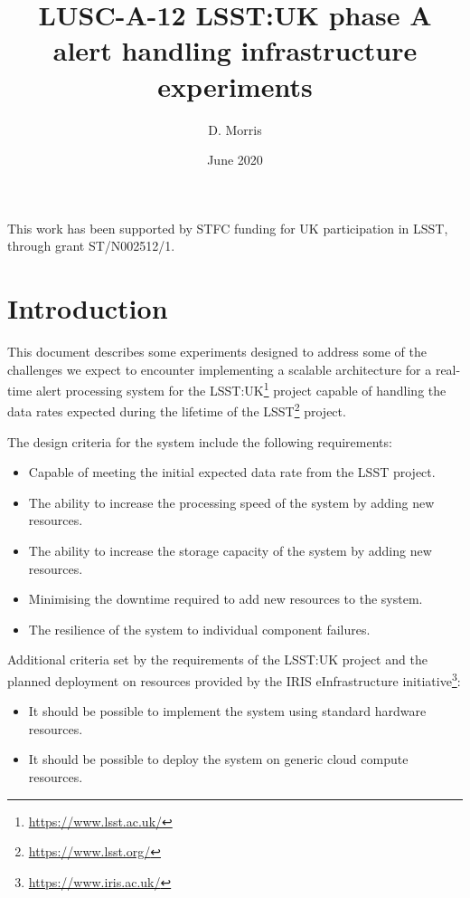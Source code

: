 \documentclass{article}
\title{LUSC-A-12 LSST:UK phase A alert handling infrastructure experiments}
\author{D. Morris}
\date{June 2020}
\newcommand{\lsst} {LSST\xspace}
\newcommand{\lsstuk} {LSST:UK\xspace}
\newcommand{\iris} {IRIS\xspace}
\newcommand{\footurl}[1] {\footnote{\url{#1}}}
\begin{document}
\maketitle

\vspace*{\fill}
This work has been supported by STFC funding for UK participation in LSST, through grant ST/N002512/1.

\clearpage

\tableofcontents
\clearpage

\section{Introduction}
\label{introduction}
This document describes some experiments designed to address some of the challenges we expect to encounter implementing a scalable architecture for a real-time alert processing system for the \lsstuk\footurl{https://www.lsst.ac.uk/} project capable of handling the data rates expected during the lifetime of the \lsst\footurl{https://www.lsst.org/} project.

The design criteria for the system include the following requirements:
\begin{itemize}
  \item Capable of meeting the initial expected data rate from the \lsst project.
  \item The ability to increase the processing speed of the system by adding new resources.
  \item The ability to increase the storage capacity of the system by adding new resources.
  \item Minimising the downtime required to add new resources to the system.
  \item The resilience of the system to individual component failures.
\end{itemize}

Additional criteria set by the requirements of the \lsstuk project and the planned deployment on resources provided by the \iris eInfrastructure initiative\footurl{https://www.iris.ac.uk/}:
\begin{itemize}
  \item It should be possible to implement the system using standard hardware resources.
  \item It should be possible to deploy the system on generic cloud compute resources.
\end{itemize}
\end{document}
